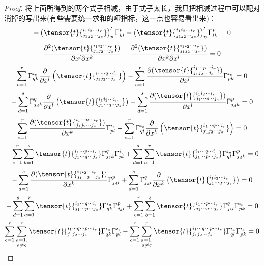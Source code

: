 \begin{proof}
将上面所得到的两个式子相减，由于式子太长，我只把相减过程中可以配对消掉的写出来(有些需要统一求和的哑指标，这一点也容易看出来)：
\[
	-\left( \tensor{t}{^{i_{1}i_{2}\cdots i_{r}}_{j_{1}j_{2}\cdots j_{s}}} \right)^{\prime}_{p}\Gamma_{kl}^{p}+\left( \tensor{t}{^{i_{1}i_{2}\cdots i_{r}}_{j_{1}j_{2}\cdots j_{s}}} \right)^{\prime}_{p}\Gamma_{lk}^{p}=0
\]
\[
	\frac{{\partial}^{2}(\tensor{t}{^{i_{1}i_{2}\cdots i_{r}}_{j_{1}j_{2}\cdots j_{s}}})}{\partial x^{l}\partial x^{k}}-\frac{{\partial}^{2}(\tensor{t}{^{i_{1}i_{2}\cdots i_{r}}_{j_{1}j_{2}\cdots j_{s}}})}{\partial x^{k}\partial x^{l}}=0
\]
\[
	\sum_{c=1}^{r}\Gamma_{qk}^{i_{c}}\frac{\partial  }{\partial x^{l}}\left( \tensor{t}{^{i_{1}\cdots q\cdots i_{r}}_{j_{1}j_{2}\cdots j_{s}}} \right)-\sum_{c=1}^{r}\frac{{\partial}(\tensor{t}{^{i_{1}\cdots p\cdots i_{r}}_{j_{1}j_{2}\cdots j_{s}}} )}{\partial x^{l}}\Gamma_{pk}^{i_{c}}=0
\]
\[
	-\sum_{d=1}^{s}\Gamma_{j_{d}k}^{q}  \frac{\partial  }{\partial x^{l}}\left(\tensor{t}{^{i_{1}i_{2}\cdots i_{r}}_{j_{1}\cdots q\cdots j_{s}}}\right)+\sum_{d=1}^{s}\frac{{\partial}( \tensor{t}{^{i_{1}i_{2}\cdots  i_{r}}_{j_{1}\cdots p\cdots j_{s}}})}{\partial x^{l}}\Gamma_{j_{d}k}^{p}=0
\]
\[
	\sum_{c=1}^{r}\frac{{\partial}(\tensor{t}{^{i_{1}\cdots p\cdots i_{r}}_{j_{1}j_{2}\cdots j_{s}}} )}{\partial x^{k}}\Gamma_{pl}^{i_{c}}-\sum_{c=1}^{r}\Gamma_{ql}^{i_{c}}\frac{\partial  }{\partial x^{k}}\left( \tensor{t}{^{i_{1}\cdots q\cdots i_{r}}_{j_{1}j_{2}\cdots j_{s}}} \right)=0
\]
\[
	-\sum_{c=1}^{r}\sum_{b=1}^{s}\tensor{t}{^{i_{1}\cdots p\cdots i_{r}}_{j_{1}\cdots q\cdots j_{s}}}\Gamma_{j_{b}k}^{q}  \Gamma_{pl}^{i_{c}}+\sum_{d=1}^{s}\sum_{a=1}^{r} \tensor{t}{^{i_{1}\cdots q \cdots i_{r}}_{j_{1}\cdots p\cdots j_{s}}}\Gamma_{ql}^{i_{a}}  \Gamma_{j_{d}k}^{p}=0
\]
\[
	-\sum_{d=1}^{s}\frac{{\partial}( \tensor{t}{^{i_{1}i_{2}\cdots  i_{r}}_{j_{1}\cdots p\cdots j_{s}}})}{\partial x^{k}}\Gamma_{j_{d}l}^{p}+\sum_{d=1}^{s}\Gamma_{j_{d}l}^{q}  \frac{\partial  }{\partial x^{k}}\left(\tensor{t}{^{i_{1}i_{2}\cdots i_{r}}_{j_{1}\cdots q\cdots j_{s}}}\right)=0
\]
\[
	-\sum_{d=1}^{s}\sum_{a=1}^{r} \tensor{t}{^{i_{1}\cdots q \cdots i_{r}}_{j_{1}\cdots p\cdots j_{s}}}\Gamma_{qk}^{i_{a}}  \Gamma_{j_{d}l}^{p}+\sum_{c=1}^{r}\sum_{b=1}^{s}\tensor{t}{^{i_{1}\cdots p\cdots i_{r}}_{j_{1}\cdots q\cdots j_{s}}}\Gamma_{j_{b}l}^{q}  \Gamma_{pk}^{i_{c}}=0
\]
\[
	\sum_{c=1}^{r}\sum_{\substack{a=1,\\ a\neq c}}^{r}\tensor{t}{^{i_{1}\cdots q\cdots p\cdots i_{r}}_{j_{1}j_{2}\cdots j_{s}}}\Gamma_{qk}^{i_{a}}\Gamma_{pl}^{i_{c}}-\sum_{c=1}^{r}\sum_{\substack{a=1,\\ a\neq c}}^{r}\tensor{t}{^{i_{1}\cdots q\cdots p\cdots i_{r}}_{j_{1}j_{2}\cdots j_{s}}}\Gamma_{ql}^{i_{a}}\Gamma_{pk}^{i_{c}}=0
\]
\end{proof}

